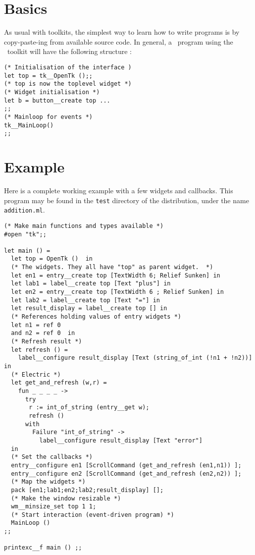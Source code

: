 \section{Basics}
As usual with toolkits, the simplest way to learn how to write programs is
by copy-paste-ing from available source code. In general, a \caml\ program
using the \tk\ 
toolkit will have the following structure :
\begin{verbatim}
(* Initialisation of the interface )
let top = tk__OpenTk ();;
(* top is now the toplevel widget *)
(* Widget initialisation *)
let b = button__create top ...
;;
(* Mainloop for events *)
tk__MainLoop()
;;
\end{verbatim} 

\section{Example}
Here is a complete working example with a few widgets and callbacks.
This program may be found in the \verb|test| directory of the distribution,
under the name \verb|addition.ml|.

\begin{verbatim}
(* Make main functions and types available *)
#open "tk";;

let main () =
  let top = OpenTk ()  in
  (* The widgets. They all have "top" as parent widget.  *)
  let en1 = entry__create top [TextWidth 6; Relief Sunken] in
  let lab1 = label__create top [Text "plus"] in
  let en2 = entry__create top [TextWidth 6 ; Relief Sunken] in
  let lab2 = label__create top [Text "="] in
  let result_display = label__create top [] in
  (* References holding values of entry widgets *)
  let n1 = ref 0
  and n2 = ref 0  in
  (* Refresh result *)
  let refresh () =
    label__configure result_display [Text (string_of_int (!n1 + !n2))]  in
  (* Electric *)
  let get_and_refresh (w,r) =
    fun _ _ _ _ ->
      try
       r := int_of_string (entry__get w);
       refresh ()
      with
        Failure "int_of_string" ->
          label__configure result_display [Text "error"]
  in
  (* Set the callbacks *)
  entry__configure en1 [ScrollCommand (get_and_refresh (en1,n1)) ];
  entry__configure en2 [ScrollCommand (get_and_refresh (en2,n2)) ];
  (* Map the widgets *)
  pack [en1;lab1;en2;lab2;result_display] [];
  (* Make the window resizable *)
  wm__minsize_set top 1 1;
  (* Start interaction (event-driven program) *)
  MainLoop ()
;;

printexc__f main () ;;
\end{verbatim}

